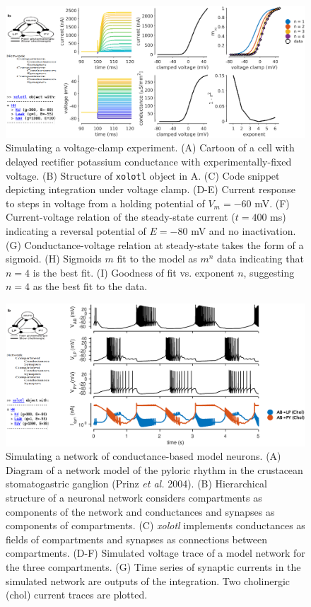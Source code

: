 \documentclass{frontiersSCNS} %
\begin{document}
\begin{figure}
	\centering
	\includegraphics[width=1.0\linewidth]{gfx/figure_clamp}
	\caption{Simulating a voltage-clamp experiment. (A) Cartoon of a cell with delayed rectifier potassium conductance \autocite{liuModelNeuronActivitydependent1998} with experimentally-fixed voltage. (B) Structure of \texttt{xolotl} object in A. (C) Code snippet depicting integration under voltage clamp. (D-E) Current response to steps in voltage from a holding potential of $V_m = -60$ mV. (F) Current-voltage relation of the steady-state current ($t = 400$ ms) indicating a reversal potential of $E = -80$ mV and no inactivation. (G) Conductance-voltage relation at steady-state takes the form of a sigmoid. (H) Sigmoids $m$ fit to the model as $m^n$ data indicating that $n=4$ is the best fit. (I) Goodness of fit vs. exponent $n$, suggesting $n=4$ as the best fit to the data.}
	\label{fig:figureclamp}
\end{figure}

\begin{figure}
	\centering
	\includegraphics[width=1.0\linewidth]{gfx/figure_network}
	\caption{Simulating a network of conductance-based model neurons. (A) Diagram of a network model of the pyloric rhythm in the crustacean stomatogastric ganglion (Prinz \textit{et al.} 2004). (B) Hierarchical structure of a neuronal network considers compartments as components of the network and conductances and synapses as components of compartments. (C) \textit{xolotl} implements conductances as fields of compartments and synapses as connections between compartments. (D-F) Simulated voltage trace of a model network for the three compartments. (G) Time series of synaptic currents in the simulated network are outputs of the integration. Two cholinergic (chol) current traces are plotted.}
	\label{fig:figurenetwork}
\end{figure}
\end{document}
